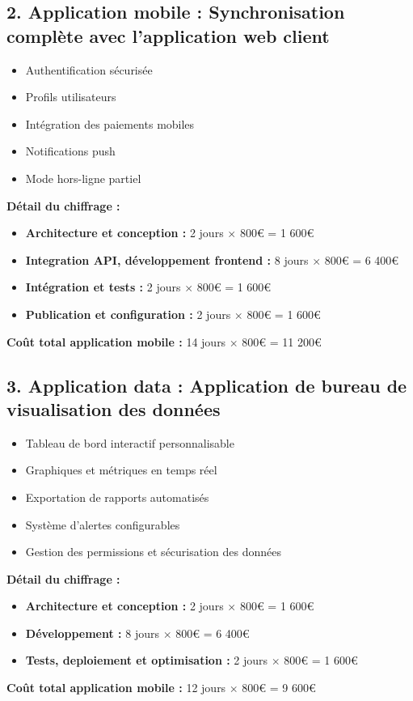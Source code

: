 \documentclass{report}
\begin{document}
\subsection*{2. Application mobile : Synchronisation complète avec l'application web client}
\vspace{0.2cm}
\begin{itemize}
    \item Authentification sécurisée
    \item Profils utilisateurs
    \item Intégration des paiements mobiles
    \item Notifications push
    \item Mode hors-ligne partiel
\end{itemize}
\vspace{0.2cm}
\noindent \textbf{Détail du chiffrage :}
\begin{itemize}
    \item \textbf{Architecture et conception :} 2 jours $\times$ 800€ = 1 600€
    \item \textbf{Integration API, développement frontend :} 8 jours $\times$ 800€ = 6 400€
    \item \textbf{Intégration et tests :} 2 jours $\times$ 800€ = 1 600€
    \item \textbf{Publication et configuration :} 2 jours $\times$ 800€ = 1 600€
\end{itemize}
\vspace{0.2cm}
\noindent \textbf{Coût total application mobile :} 14 jours $\times$ 800€ = 11 200€
\vspace{0.5cm}
\subsection*{3. Application data : Application de bureau de visualisation des données}
\vspace{0.2cm}
\begin{itemize}
    \item Tableau de bord interactif personnalisable
    \item Graphiques et métriques en temps réel
    \item Exportation de rapports automatisés
    \item Système d'alertes configurables
    \item Gestion des permissions et sécurisation des données
\end{itemize}
\noindent \textbf{Détail du chiffrage :}
\begin{itemize}
    \item \textbf{Architecture et conception :} 2 jours $\times$ 800€ = 1 600€
    \item \textbf{Développement :} 8 jours $\times$ 800€ = 6 400€
    \item \textbf{Tests, deploiement et optimisation :} 2 jours $\times$ 800€ = 1 600€
\end{itemize}
\vspace{0.2cm}
\noindent \textbf{Coût total application mobile :} 12 jours $\times$ 800€ = 9 600€
\newpage
\end{document}
